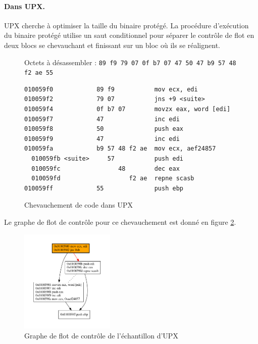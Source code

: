 \paragraph{Dans UPX.}
UPX \cite{UPX} cherche à optimiser la taille du binaire protégé.
La procédure d'exécution du binaire protégé utilise un saut conditionnel pour séparer le contrôle de flot en deux blocs se chevauchant et finissant sur un bloc où ils se réalignent.
\begin{figure}[h]
Octets à désassembler : \texttt{89 f9 79 07 0f b7 07 47 50 47 b9 57 48 f2 ae 55}
\begin{lstlisting}[language={[x86masm]Assembler}, escapechar=~]
010059f0            89 f9           mov ecx, edi
010059f2            79 07           jns +9 <suite>
010059f4            0f b7 07        movzx eax, word [edi]
010059f7            47              inc edi
010059f8            50              push eax
010059f9            47              inc edi
010059fa            b9 57 48 f2 ae  mov ecx, aef24857
  010059fb <suite>     57           push edi
  010059fc                48        dec eax
  010059fd                   f2 ae  repne scasb
010059ff            55              push ebp
\end{lstlisting}
\caption{Chevauchement de code dans UPX\label{fig:upx_obf_disas}}
\end{figure}

Le graphe de flot de contrôle pour ce chevauchement est donné en figure \ref{fig:upx_cfg}.

\begin{figure}[h]
\begin{center}
\includegraphics[width=0.4\textwidth]{supports/disasm/upx/upx.pdf}
\end{center}
\caption{Graphe de flot de contrôle de l'échantillon d'UPX}
\label{fig:upx_cfg}
\end{figure}

